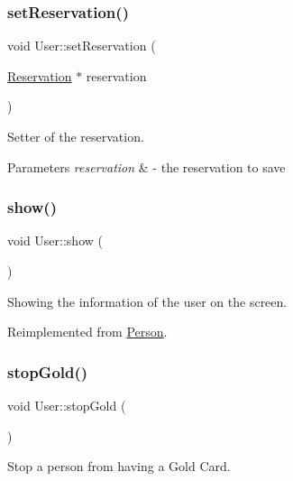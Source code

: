 \subsubsection{\texorpdfstring{set\+Reservation()}{setReservation()}}
{\footnotesize\ttfamily void User\+::set\+Reservation (\begin{DoxyParamCaption}\item[{\mbox{\hyperlink{class_reservation}{Reservation}} $\ast$}]{reservation }\end{DoxyParamCaption})}



Setter of the reservation. 


\begin{DoxyParams}{Parameters}
{\em reservation} & -\/ the reservation to save \\
\hline
\end{DoxyParams}
\mbox{\label{class_user_ac8a201055d02b313721e56c4c0f6af82}} 
\subsubsection{\texorpdfstring{show()}{show()}}
{\footnotesize\ttfamily void User\+::show (\begin{DoxyParamCaption}{ }\end{DoxyParamCaption})\hspace{0.3cm}{\ttfamily [virtual]}}



Showing the information of the user on the screen. 



Reimplemented from \mbox{\hyperlink{class_person_a2f1231629a6e7e8c83ada57628e80a89}{Person}}.

\mbox{\label{class_user_a88a8b41f134b21aeb702c481ffee0ef4}} 
\subsubsection{\texorpdfstring{stop\+Gold()}{stopGold()}}
{\footnotesize\ttfamily void User\+::stop\+Gold (\begin{DoxyParamCaption}{ }\end{DoxyParamCaption})}



Stop a person from having a Gold Card. 

